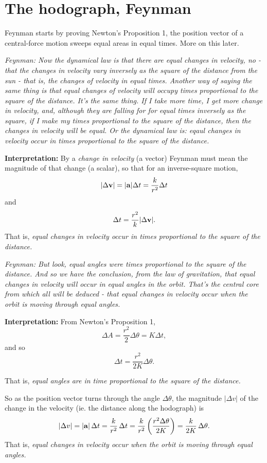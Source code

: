 \documentclass{ximera}
\begin{document}
\section*{The hodograph, Feynman}

Feynman starts by proving Newton's Proposition 1, the position vector of a central-force motion sweeps equal areas in equal times. 
More on this later.


\emph{Feynman: Now the dynamical law is that there are equal changes in velocity, no - that the changes in velocity vary inversely as the square of the distance from the sun - that is, the changes of velocity in equal times. Another way of saying the same thing is that equal changes of velocity will occupy times proportional to the square of the distance. It's the same thing. If I take more time, I get more change in velocity, and, although they are falling for for equal times inversely as the square, if I make my times proportional to the square of the distance, then the changes in velocity will be equal. Or the dynamical law is: eqaul changes in velocity occur in times proportional to the square of the distance.} 

{\bf Interpretation:} By a \emph{change in velocity} (a vector) Feynman must mean the magnitude of that change (a scalar), so that for an inverse-square motion, 
\[
    | \Delta {\bf v} | = |{\bf a}| \Delta t = \frac{k}{r^2} \Delta t
\]
and 
\[
   \Delta t = \frac{r^2}{k} | \Delta {\bf v}|.
\]
That is, \emph{equal changes in velocity occur in times proportional to the square of the distance.}

\emph{Feynman: But look, equal angles were times proportional to the square of the distance. And so we have the conclusion, from the law of gravitation, that equal changes in velocity will occur in equal angles in the orbit. That's the central core from which all will be deduced - that equal changes in velocity occur when the orbit is moving through equal angles.
}

{\bf Interpretation:} From Newton's Proposition 1,
\[
  \Delta A = \frac{r^2}{2} \Delta \theta = K \Delta t ,
\]
and so
\[
  \Delta t = \frac{r^2}{2K} \Delta \theta.
\]
 
That is, \emph{equal angles are in time proportional to the square of the distance.}

So as the position vector turns through the angle $\Delta \theta$, the magnitude $|\Delta v|$ of the change in the velocity (ie. the distance along the hodograph) is
\[
    |\Delta v| = |{\bf a}|\, \Delta t = \frac{k}{r^2}\, \Delta t = \frac{k}{r^2} \left(  \frac{r^2 \Delta \theta}{2K}\right) =\frac{k}{2K}\, \Delta \theta.
\]
That is, \emph{equal changes in velocity occur when the orbit is moving through equal angles.}
\end{document}
